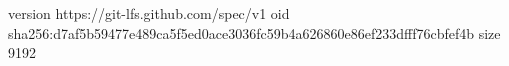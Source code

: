 version https://git-lfs.github.com/spec/v1
oid sha256:d7af5b59477e489ca5f5ed0ace3036fc59b4a626860e86ef233dfff76cbfef4b
size 9192
